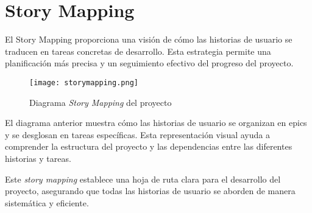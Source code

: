 \newpage{}
\section{Story Mapping}
El Story Mapping proporciona una visión de cómo las historias de usuario se
traducen en tareas concretas de desarrollo. Esta estrategia permite una
planificación más precisa y un seguimiento efectivo del progreso del proyecto.

\begin{figure}[h]
	\centering
	\texttt{[image: storymapping.png]}
	\caption{Diagrama \textit{Story Mapping} del proyecto}
	\label{fig:story_mapping}
\end{figure}

El diagrama anterior muestra cómo las historias de usuario se organizan en
epics y se desglosan en tareas específicas. Esta representación visual ayuda a
comprender la estructura del proyecto y las dependencias entre las diferentes
historias y tareas.

Este \textit{story mapping} establece una hoja de ruta clara para el desarrollo
del proyecto, asegurando que todas las historias de usuario se aborden de manera
sistemática y eficiente.
